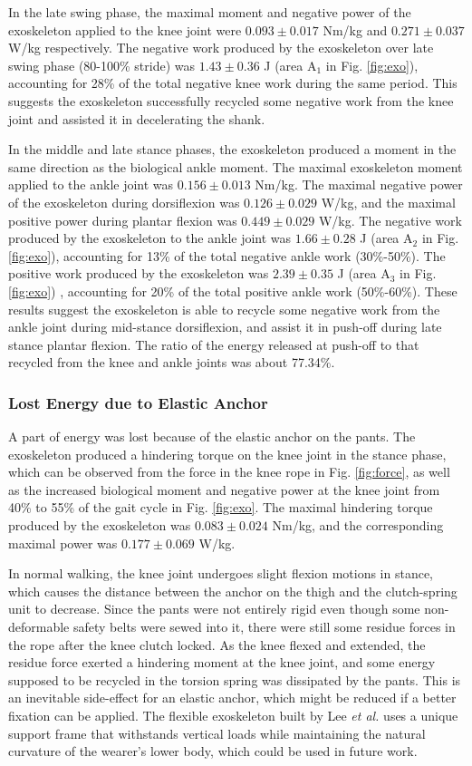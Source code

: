 \documentclass[twocolumn,cleanfoot,10pt]{asme2ej}
\begin{document}
In the late swing phase, the maximal moment and negative power of the exoskeleton applied to the knee joint were $0.093\pm0.017$ Nm/kg and $0.271\pm0.037$ W/kg respectively.
The negative work produced by the exoskeleton over late swing phase (80-100\% stride) was $1.43\pm0.36$ J (area A$_{1}$ in Fig. \ref{fig:exo}), accounting for 28\% of the total negative knee work during the same period.
This suggests the exoskeleton successfully recycled some negative work from the knee joint and assisted it in decelerating the shank.

In the middle and late stance phases, the exoskeleton produced a moment in the same direction as the biological ankle moment.
The maximal exoskeleton moment applied to the ankle joint was $0.156\pm0.013$ Nm/kg.
The maximal negative power of the exoskeleton during dorsiflexion was $0.126\pm0.029$ W/kg, and the maximal positive power during plantar flexion was $0.449\pm0.029$ W/kg.
The negative work produced by the exoskeleton to the ankle joint was $1.66\pm0.28$ J (area A$_{2}$ in Fig. \ref{fig:exo}), accounting for 13\% of the total negative ankle work (30\%-50\%).
The positive work produced by the exoskeleton was $2.39\pm0.35$ J (area A$_{3}$ in Fig. \ref{fig:exo}) , accounting for 20\% of the total positive ankle work (50\%-60\%).
These results suggest the exoskeleton is able to recycle some negative work from the ankle joint during mid-stance dorsiflexion, and assist it in push-off during late stance plantar flexion.
The ratio of the energy released at push-off to that recycled from the knee and ankle joints was about 77.34\%.

\subsubsection{Lost Energy due to Elastic Anchor}
A part of energy was lost because of the elastic anchor on the pants.
The exoskeleton produced a hindering torque on the knee joint in the stance phase, which can be observed from the force in the knee rope in Fig. \ref{fig:force}, as well as the increased biological moment and negative power at the knee joint from 40\% to 55\% of the gait cycle in Fig. \ref{fig:exo}. 
The maximal hindering torque produced by the exoskeleton was $0.083\pm0.024$ Nm/kg, and the corresponding maximal power was $0.177\pm0.069$ W/kg.

In normal walking, the knee joint undergoes slight flexion motions in stance, which causes the distance between the anchor on the thigh and the clutch-spring unit to decrease.
Since the pants were not entirely rigid even though some non-deformable safety belts were sewed into it, there were still some residue forces in the rope after the knee clutch locked.
As the knee flexed and extended, the residue force exerted a hindering moment at the knee joint, and some energy supposed to be recycled in the torsion spring was dissipated by the pants.
This is an inevitable side-effect for an elastic anchor, which might be reduced if a better fixation can be applied.
The flexible exoskeleton built by Lee \emph{et al.} \cite{exosuit} uses a unique support frame that withstands vertical loads while maintaining the natural curvature of the wearer's lower body, which could be used in future work.
\end{document}
